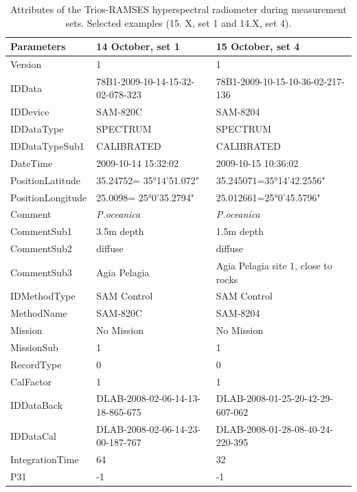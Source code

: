 \documentclass[10pt, a4paper]{article}
\begin{document}
\begin{appendices}
\begin{table}[H]
	\caption{Attributes of the Trios-RAMSES hyperspectral radiometer during measurement sets. Selected examples (15. X, set 1 and 14.X, set 4).}\label{tab:A.2}	\centering
	\begin{tabular}{| p{3cm} | p{3cm} | p{5cm} |}
	\hline
	    \textbf{Parameters} & \textbf{14 October, set 1} & \textbf{15 October, set 4} \\ \hline \hline
	     Version &1 & 1 \\ \hline
	     IDData & 78B1-2009-10-14-15-32-02-078-323 & 78B1-2009-10-15-10-36-02-217-136 \\ \hline
	     IDDevice & SAM-820C & SAM-8204\\ \hline
	     IDDataType & SPECTRUM & SPECTRUM \\ \hline
	     IDDataTypeSub1 & CALIBRATED & CALIBRATED \\ \hline
	      DateTime & 2009-10-14 15:32:02 & 2009-10-15 10:36:02 \\ \hline
	     PositionLatitude & 35.24752= 35°14'51.072" & 35.245071=35°14'42.2556" \\ \hline
	     PositionLongitude & 25.0098= 25°0'35.2794" & 25.012661=25°0'45.5796" \\ \hline
	     Comment & \textit{P.oceanica} & \textit{P.oceanica} \\ \hline
	     CommentSub1 & 3.5m depth & 1.5m depth \\ \hline
	     CommentSub2 & diffuse & diffuse \\ \hline
	     CommentSub3 & Agia Pelagia & Agia Pelagia site 1, close to rocks \\ \hline
	     IDMethodType & SAM Control & SAM Control \\ \hline
	    MethodName & SAM-820C & SAM-8204 \\ \hline
	    Mission & No Mission & No Mission \\ \hline
	    MissionSub & 1 & 1 \\ \hline
	    RecordType & 0 & 0 \\ \hline
	    CalFactor & 1 & 1 \\ \hline
	   IDDataBack & DLAB-2008-02-06-14-13-18-865-675 & DLAB-2008-01-25-20-42-29-607-062 \\ \hline
	   IDDataCal & DLAB-2008-02-06-14-23-00-187-767 & DLAB-2008-01-28-08-40-24-220-395 \\ \hline
	   IntegrationTime & 64 & 32 \\ \hline
	    P31 & -1 & -1 \\ \hline

\end{tabular}
\end{table}
\end{appendices}
\end{document}
